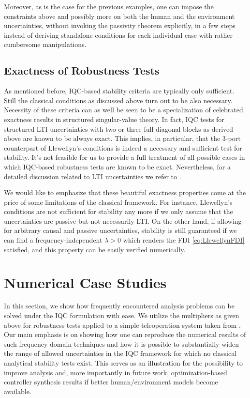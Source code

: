 Moreover, as is the case for the previous examples, one can impose the constraints above and possibly more on both the human 
and the environment uncertainties, without invoking the passivity theorem explicitly, in a few steps instead of deriving 
standalone conditions for each individual case with rather cumbersome manipulations. 

\subsection{Exactness of Robustness Tests}\label{sec:exact}
As mentioned before, IQC-based stability criteria are typically only sufficient.
Still the classical conditions as discussed above %
turn out to be also necessary. Necessity of these criteria can as well be seen to be a specialization of
celebrated exactness results in structured singular-value theory. In fact, IQC tests
for structured LTI uncertainties with two or three full diagonal blocks as derived above are known to be always exact.
This implies, in particular, that the 3-port counterpart of Llewellyn's conditions is indeed
a necessary and sufficient test for stability. It's not feasible for us to provide a full treatment of all possible 
cases in which IQC-based robustness tests are known to be exact. Nevertheless, for a detailed discussion related to LTI 
uncertainties we refer to \cite{packdoyle,fantits,cwssimax}.

We would like to emphasize that these beautiful exactness properties come at the price of some limitations 
of the classical framework. For instance, Llewellyn's conditions are not sufficient for stability any more 
if we only assume that the uncertainties are passive but not necessarily LTI. On the other hand, if allowing 
for arbitrary causal and passive uncertainties, stability is still guaranteed if we can find a 
frequency-independent $\lambda>0$ which renders the FDI \eqref{eq:LlewellynFDI} satisfied, and this property 
can be easily verified numerically.

\section{Numerical Case Studies}\label{sec:num}
In this section, we show how frequently encountered analysis problems can be solved 
under the IQC formulation with ease. We utilize the multipliers as given above for  
robustness tests applied to a simple teleoperation system taken from \cite{willaert,
willaertIJRR10}. Our main emphasis is on showing how one can reproduce the numerical 
results of such frequency domain techniques and 
how it is possible to substantially widen the range of allowed uncertainties in the 
IQC framework for which no classical analytical stability tests exist. This serves as 
an illustration for the possibility to improve analysis and, more importantly in 
future work, optimization-based controller synthesis results if better human/environment 
models become available.

